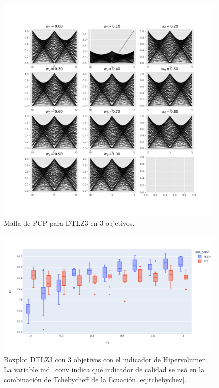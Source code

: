 \begin{figure} [H]
    \centering
    \includegraphics[width=\textwidth]{Figuras/DTLZ3_obj_3_alg_IGD+_indmed_HV_malla._PCP.pdf}
    \caption[Malla de PCP  de aproximaciones al PF.]{Malla de PCP para DTLZ3 en 3 objetivos.}
    \label{fig:PCP}
\end{figure}



\begin{figure} [H]
    \centering
    \includegraphics[width=\textwidth]{Figuras/WFG4_3obj_HV.pdf}
    \caption[Boxplot DTLZ3 HV.]{Boxplot DTLZ3 con 3 objetivos con el indicador de Hipervolumen. La variable ind\_conv indica qué indicador de calidad se usó en la combinación de Tchebycheff de la Ecuación \eqref{eq:tchebychev}.}
    \label{fig:box}
\end{figure}




